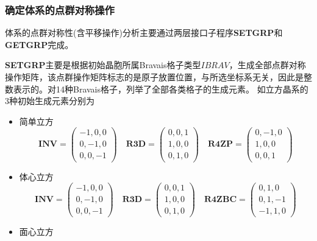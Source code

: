 \subsubsection{确定体系的点群对称操作}
体系的点群对称性(含平移操作)分析主要通过两层接口子程序\textbf{SETGRP}和\textbf{GETGRP}完成。

\textbf{SETGRP}主要是根据初始晶胞所属\textrm{Bravais}格子类型$\mathit{IBRAV}$，生成全部点群对称操作矩阵，该点群操作矩阵标志的是原子放置位置，与所选坐标系无关，因此是整数表示的。对14种\textrm{Bravais}格子，列举了全部各类格子的生成元素。
如立方晶系的3种初始生成元素分别为
\begin{itemize}
	\item 简单立方
\begin{displaymath}
	\mathbf{INV}=
	\begin{pmatrix}
		-1, 0, 0 \\ 
		0,-1, 0 \\
		0, 0, -1
	\end{pmatrix}\quad
	\mathbf{R3D}=
	\begin{pmatrix}
		0, 0, 1 \\ 
		1, 0, 0 \\
		0, 1, 0
	\end{pmatrix}\quad
	\mathbf{R4ZP}=
	\begin{pmatrix}
		0, -1, 0 \\ 
		1, 0, 0 \\
		0, 0, 1
	\end{pmatrix}
\end{displaymath}
	\item 体心立方
\begin{displaymath}
	\mathbf{INV}=
	\begin{pmatrix}
		-1, 0, 0 \\ 
		0,-1, 0 \\
		0, 0, -1
	\end{pmatrix}\quad
	\mathbf{R3D}=
	\begin{pmatrix}
		0, 0, 1 \\ 
		1, 0, 0 \\
		0, 1, 0
	\end{pmatrix}\quad
	\mathbf{R4ZBC}=
	\begin{pmatrix}
		0, 1, 0 \\ 
		0, 1, -1 \\
		-1, 1, 0
	\end{pmatrix}
\end{displaymath}
	\item 面心立方
\begin{displaymath}

\end{displaymath}
\end{itemize}
